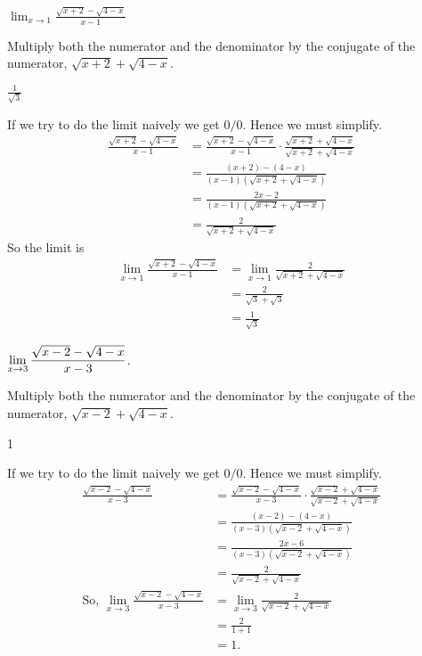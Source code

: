 \begin{Mquestion}[2015Q]
$\displaystyle \lim_{x\rightarrow 1} \frac{\sqrt{x+2}-\sqrt{4-x}}{x-1}$
\end{Mquestion}
\begin{hint}
Multiply both the numerator and the denominator by the
        conjugate of the numerator, $\sqrt{x+2}+\sqrt{4-x}$.
\end{hint}
\begin{answer} $\frac{1}{\sqrt{3}}$
\end{answer}
\begin{solution}
If we try to do the limit naively we get $0/0$. Hence we must simplify.
\begin{align*}
\frac{\sqrt{x+2}-\sqrt{4-x}}{x-1}
  &= \frac{\sqrt{x+2}-\sqrt{4-x}}{x-1}
  \cdot \frac{\sqrt{x+2}+\sqrt{4-x}}{\sqrt{x+2}+\sqrt{4-x}}\\
  &= \frac{(x+2)-(4-x)}{(x-1)(\sqrt{x+2}+\sqrt{4-x})} \\
  &= \frac{2x-2}{(x-1)(\sqrt{x+2}+\sqrt{4-x})} \\
  &= \frac{2}{\sqrt{x+2}+\sqrt{4-x}}
\end{align*}
So the limit is
\begin{align*}
\lim_{x\to1} \frac{\sqrt{x+2}-\sqrt{4-x}}{x-1}
  &=\lim_{x\to1} \frac{2}{\sqrt{x+2}+\sqrt{4-x}} \\
  &= \frac{2}{\sqrt{3}+\sqrt{3} }\\
  &= \frac{1}{\sqrt{3}}
\end{align*}
\end{solution}


\begin{question}[2015Q]
$\displaystyle \lim_{x\to 3} \frac{\sqrt{x-2}-\sqrt{4-x}}{x-3}$.
\end{question}
\begin{hint}
Multiply both the numerator and the denominator by the
        conjugate of the numerator, $ \sqrt{x-2}+\sqrt{4-x}$.
\end{hint}
\begin{answer} 1
\end{answer}
\begin{solution}
If we try to do the limit naively we get $0/0$. Hence we must simplify.
 \begin{align*}
\frac{\sqrt{x-2}-\sqrt{4-x}}{x-3}
  &= \frac{\sqrt{x-2}-\sqrt{4-x}}{x-3}
  \cdot \frac{\sqrt{x-2}+\sqrt{4-x}}{\sqrt{x-2}+\sqrt{4-x}}\\
  &= \frac{(x-2)-(4-x)}{(x-3)(\sqrt{x-2}+\sqrt{4-x})} \\
  &= \frac{2x-6}{(x-3)(\sqrt{x-2}+\sqrt{4-x})} \\
  &= \frac{2}{\sqrt{x-2}+\sqrt{4-x}}\\
  \mbox{So, }
\lim_{x\to 3} \frac{\sqrt{x-2}-\sqrt{4-x}}{x-3}
  &=\lim_{x\to 3} \frac{2}{\sqrt{x-2}+\sqrt{4-x}} \\
  &= \frac{2}{1+1 }\\
  &= 1.
\end{align*}
\end{solution}



